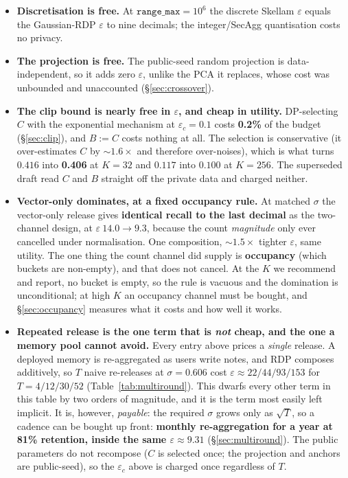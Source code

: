 \documentclass[pdflatex,sn-mathphys-num,iicol]{sn-jnl}
\theoremstyle{thmstyleone}%
\theoremstyle{thmstyletwo}%
\theoremstyle{thmstylethree}%
\newcommand{\eps}{\varepsilon}
\newcommand{\secref}[1]{\S\ref{#1}}
\begin{document}
\begin{itemize}
  \item \textbf{Discretisation is free.} At $\texttt{range\_max} = 10^{6}$ the discrete
    Skellam $\eps$ equals the Gaussian-RDP $\eps$ to nine decimals; the integer/SecAgg
    quantisation costs no privacy.
  \item \textbf{The projection is free.} The public-seed random projection is
    data-independent, so it adds zero $\eps$, unlike the PCA it replaces, whose cost was
    unbounded and unaccounted (\secref{sec:crossover}).
  \item \textbf{The clip bound is nearly free in $\eps$, and cheap in utility.}
    DP-selecting $C$ with the exponential mechanism at $\eps_c = 0.1$ costs \textbf{0.2\%}
    of the budget (\secref{sec:clip}), and $B := C$ costs nothing at all. The selection is
    conservative (it over-estimates $C$ by ${\sim}1.6\times$ and therefore over-noises),
    which is what turns $0.416$ into \textbf{0.406} at $K = 32$ and $0.117$ into $0.100$ at
    $K = 256$. The superseded draft read $C$ and $B$ straight off the private data and
    charged neither.
  \item \textbf{Vector-only dominates, at a fixed occupancy rule.} At matched $\sigma$ the
    vector-only release gives \textbf{identical recall to the last decimal} as the
    two-channel design, at $\eps\ 14.0 \to 9.3$, because the count \emph{magnitude} only ever
    cancelled under normalisation. One composition, ${\sim}1.5\times$ tighter $\eps$, same
    utility. The one thing the count channel did supply is \textbf{occupancy} (which
    buckets are non-empty), and that does not cancel. At the $K$ we recommend and report, no
    bucket is empty, so the rule is vacuous and the domination is unconditional; at high $K$
    an occupancy channel must be bought, and \secref{sec:occupancy} measures what it costs
    and how well it works.

  \item \textbf{Repeated release is the one term that is \emph{not} cheap, and the one a
    memory pool cannot avoid.} Every entry above prices a \emph{single} release. A deployed
    memory is re-aggregated as users write notes, and RDP composes additively, so $T$ naive
    re-releases at $\sigma = 0.606$ cost $\eps \approx 22 / 44 / 93 / 153$ for
    $T = 4 / 12 / 30 / 52$ (Table~\ref{tab:multiround}). This dwarfs every other term in this
    table by two orders of magnitude, and it is the term most easily left implicit. It is,
    however, \emph{payable}: the required $\sigma$ grows only as $\sqrt{T}$, so a cadence can
    be bought up front: \textbf{monthly re-aggregation for a year at 81\% retention, inside
    the same $\eps \approx 9.31$} (\secref{sec:multiround}). The public parameters do not
    recompose ($C$ is selected once; the projection and anchors are public-seed), so the
    $\eps_c$ above is charged once regardless of $T$.
\end{itemize}
\end{document}

